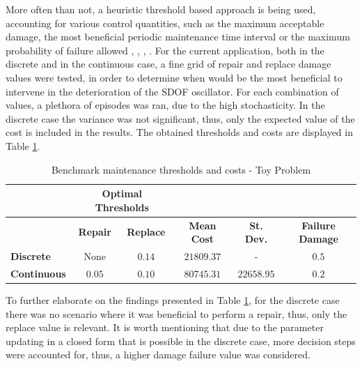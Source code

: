 More often than not, a heuristic threshold based approach is being used, accounting for various control quantities, such as the maximum acceptable damage, the most beneficial periodic maintenance time interval or the maximum probability of failure allowed \cite{keizer2017condition}, \cite{grall2002condition}, \cite{barone2014reliability}, \cite{li2015time}. For the current application, both in the discrete and in the continuous case, a fine grid of repair and replace damage values were tested, in order to determine when would be the most beneficial to intervene in the deterioration of the \gls{SDOF} oscillator. For each combination of values, a plethora of episodes was ran, due to the high stochasticity. In the discrete case the variance was not significant, thus, only the expected value of the cost is included in the results. The obtained thresholds and costs are displayed in Table \ref{benchValues}.

\begin{table}[H]
    \centering
    \caption{Benchmark maintenance thresholds and costs - Toy Problem}
    \label{benchValues}
    \begin{tabular}{lccccc}
                            & \multicolumn{2}{c}{\textbf{Optimal Thresholds}} &                    &                                       \\ \toprule
                            & \textbf{Repair}        & \textbf{Replace}       & \textbf{Mean Cost} & \multicolumn{1}{c}{\textbf{St. Dev.}} & \textbf{Failure Damage} \\ \midrule
        \textbf{Discrete}   & None                   & $0.14$                   & $\boldsymbol{21809.37}$  & - & $0.5$ \\
        \textbf{Continuous} & $0.05$ & $0.10$ & $\boldsymbol{80745.31}$  & $22658.95$ & $0.2$ \\ \bottomrule                         
    \end{tabular}
\end{table}

To further elaborate on the findings presented in Table \ref{benchValues}, for the discrete case there was no scenario where it was beneficial to perform a repair, thus, only the replace value is relevant. It is worth mentioning that due to the parameter updating in a closed form that is possible in the discrete case, more decision steps were accounted for, thus, a higher damage failure value was considered.


